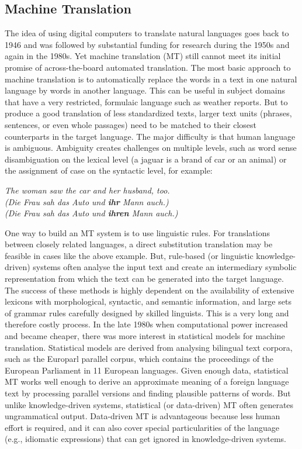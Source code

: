 \documentclass[]{../metanetpaper}
\begin{document}
	\subsection{Machine Translation}
The idea of using digital computers to translate natural languages goes back to 1946 and was followed by substantial funding for research during the 1950s and again in the 1980s. Yet machine translation (MT) still cannot meet its initial promise of across-the-board automated translation.  
The most basic approach to machine translation is to automatically replace the words in a text in one natural language by words in another language. This can be useful in subject domains that have a very restricted, formulaic language such as weather reports. But to produce a good translation of less standardized texts, larger text units (phrases, sentences, or even whole passages) need to be matched to their closest counterparts in the target language. The major difficulty is that human language is ambiguous. Ambiguity creates challenges on multiple levels, such as word sense disambiguation on the lexical level (a jaguar is a brand of car or an animal) or the assignment of case on the syntactic level, for example:
\begin{center}
\textit{The woman saw the car and her husband, too.\\
(Die Frau sah das Auto und \textbf{ihr} Mann auch.)\\
(Die Frau sah das Auto und \textbf{ihren} Mann auch.)}
\end{center}
One way to build an MT system is to use linguistic rules. For translations between closely related languages, a direct substitution translation may be feasible in cases like the above example. But, rule-based (or linguistic knowledge-driven) systems often analyse the input text and create an intermediary symbolic representation from which the text can be generated into the target language. The success of these methods is highly dependent on the availability of extensive lexicons with morphological, syntactic, and semantic information, and large sets of grammar rules carefully designed by skilled linguists. This is a very long and therefore costly process.
In the late 1980s when computational power increased and became cheaper, there was more interest in statistical models for machine translation. Statistical models are derived from analysing bilingual text corpora, such as the Europarl parallel corpus, which contains the proceedings of the European Parliament in 11 European languages. Given enough data, statistical MT works well enough to derive an approximate meaning of a foreign language text by processing parallel versions and finding plausible patterns of words. But unlike knowledge-driven systems, statistical (or data-driven) MT often generates ungrammatical output. Data-driven MT is advantageous because less human effort is required, and it can also cover special particularities of the language (e.g., idiomatic expressions) that can get ignored in knowledge-driven systems. 
\end{document}
